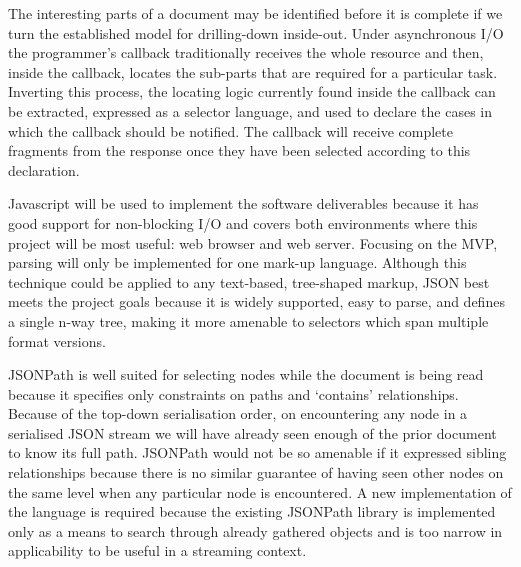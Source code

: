 \documentclass[12pt, ]{article}
\begin{document}
The interesting parts of a document may be identified before it is
complete if we turn the established model for drilling-down inside-out.
Under asynchronous I/O the programmer's callback traditionally receives
the whole resource and then, inside the callback, locates the sub-parts
that are required for a particular task. Inverting this process, the
locating logic currently found inside the callback can be extracted,
expressed as a selector language, and used to declare the cases in which
the callback should be notified. The callback will receive complete
fragments from the response once they have been selected according to
this declaration.

Javascript will be used to implement the software deliverables because
it has good support for non-blocking I/O and covers both environments
where this project will be most useful: web browser and web server.
Focusing on the MVP, parsing will only be implemented for one mark-up
language. Although this technique could be applied to any text-based,
tree-shaped markup, JSON best meets the project goals because it is
widely supported, easy to parse, and defines a single n-way tree, making
it more amenable to selectors which span multiple format versions.

JSONPath is well suited for selecting nodes while the document is being
read because it specifies only constraints on paths and `contains'
relationships. Because of the top-down serialisation order, on
encountering any node in a serialised JSON stream we will have already
seen enough of the prior document to know its full path. JSONPath would
not be so amenable if it expressed sibling relationships because there
is no similar guarantee of having seen other nodes on the same level
when any particular node is encountered. A new implementation of the
language is required because the existing JSONPath library is
implemented only as a means to search through already gathered objects
and is too narrow in applicability to be useful in a streaming context.
\end{document}
